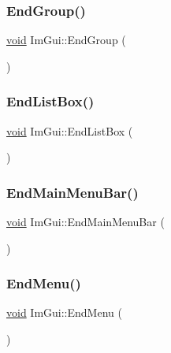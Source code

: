 \subsubsection{\texorpdfstring{End\+Group()}{EndGroup()}}
{\footnotesize\ttfamily \hyperlink{imgui__impl__opengl3__loader_8h_ac668e7cffd9e2e9cfee428b9b2f34fa7}{void} Im\+Gui\+::\+End\+Group (\begin{DoxyParamCaption}{ }\end{DoxyParamCaption})}

\mbox{\label{namespaceImGui_a6a1b63d9b66bb934d995c279ac02daff}} 
\subsubsection{\texorpdfstring{End\+List\+Box()}{EndListBox()}}
{\footnotesize\ttfamily \hyperlink{imgui__impl__opengl3__loader_8h_ac668e7cffd9e2e9cfee428b9b2f34fa7}{void} Im\+Gui\+::\+End\+List\+Box (\begin{DoxyParamCaption}{ }\end{DoxyParamCaption})}

\mbox{\label{namespaceImGui_ab92f330c808546b340eb7bdf7e5f7c95}} 
\subsubsection{\texorpdfstring{End\+Main\+Menu\+Bar()}{EndMainMenuBar()}}
{\footnotesize\ttfamily \hyperlink{imgui__impl__opengl3__loader_8h_ac668e7cffd9e2e9cfee428b9b2f34fa7}{void} Im\+Gui\+::\+End\+Main\+Menu\+Bar (\begin{DoxyParamCaption}{ }\end{DoxyParamCaption})}

\mbox{\label{namespaceImGui_a1448a5a4e8c431c15f991e9255c0df95}} 
\subsubsection{\texorpdfstring{End\+Menu()}{EndMenu()}}
{\footnotesize\ttfamily \hyperlink{imgui__impl__opengl3__loader_8h_ac668e7cffd9e2e9cfee428b9b2f34fa7}{void} Im\+Gui\+::\+End\+Menu (\begin{DoxyParamCaption}{ }\end{DoxyParamCaption})}

